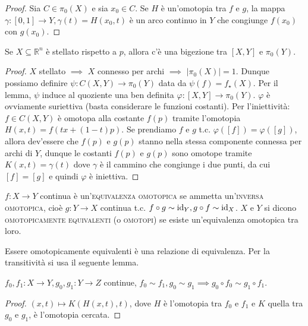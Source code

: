 \begin{proof}
  Sia $C \in \pi_0(X)$ e sia $x_0 \in C$. Se $H$ è un'omotopia tra $f$ e $g$, la mappa $\gamma:[0, 1] \rightarrow Y, \gamma(t)=H(x_0, t)$ è un arco continuo in $Y$ che congiunge $f(x_0)$ con $g(x_0)$.
\end{proof}

\begin{ftt}
  Se $X \subseteq \mathbb{R}^n$ è stellato rispetto a $p$, allora c'è una bigezione tra $[X, Y]$ e $\pi_0(Y)$.
\end{ftt}

\begin{proof}
  $X$ stellato $\implies$ $X$ connesso per archi $\implies$ $|\pi_0(X)|=1$. Dunque possiamo definire $\psi:C(X, Y) \rightarrow \pi_0(Y)$ data da $\psi(f)=f_{\star}(X)$. Per il lemma, $\psi$ induce al quoziente una ben definita $\varphi:[X, Y] \rightarrow \pi_0(Y)$. $\varphi$ è ovviamente suriettiva (basta considerare le funzioni costanti). Per l'iniettività: $f \in C(X, Y)$ è omotopa alla costante $f(p)$ tramite l'omotopia $H(x, t)=f(tx+(1-t)p)$.
  Se prendiamo $f$ e $g$ t.c. $\varphi([f])=\varphi([g])$, allora dev'essere che $f(p)$ e $g(p)$ stanno nella stessa componente connessa per archi di $Y$, dunque le costanti $f(p)$ e $g(p)$ sono omotope tramite $K(x, t)=\gamma(t)$ dove $\gamma$ è il cammino che congiunge i due punti, da cui $[f]=[g]$ e quindi $\varphi$ è iniettiva.
\end{proof}

\begin{defn}
  $f:X \rightarrow Y$ continua è un'\textsc{equivalenza omotopica} se ammetta un'\textsc{inversa omotopica}, cioè $g:Y \rightarrow X$ continua t.c. $f \circ g \sim \operatorname{id}_Y, g \circ f \sim \operatorname{id}_X$. $X$ e $Y$ si dicono \textsc{omotopicamente equivalenti} (o \textsc{omotopi}) se esiste un'equivalenza omotopica tra loro.
\end{defn}

\begin{exc}
  Essere omotopicamente equivalenti è una relazione di equivalenza. Per la transitività si usa il seguente lemma.
\end{exc}

\begin{lm}
  $f_0, f_1:X \rightarrow Y, g_0, g_1:Y \rightarrow Z$ continue, $f_0 \sim f_1, g_0 \sim g_1 \implies g_0 \circ f_0 \sim g_1 \circ f_1$.
\end{lm}

\begin{proof}
  $(x, t) \mapsto K(H(x, t), t)$, dove $H$ è l'omotopia tra $f_0$ e $f_1$ e $K$ quella tra $g_0$ e $g_1$, è l'omotopia cercata.
\end{proof}

